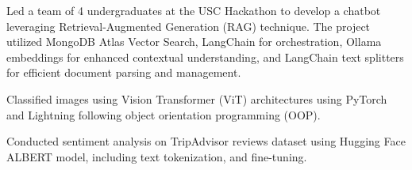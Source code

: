 \begin{cventries}
{\begin{cvitemsfree}
            \item {Led a team of 4 undergraduates at the USC Hackathon to develop a chatbot leveraging Retrieval-Augmented Generation (RAG) technique. The project utilized MongoDB Atlas Vector Search, LangChain for orchestration, Ollama embeddings for enhanced contextual understanding, and LangChain text splitters for efficient document parsing and management.}
            \item{Classified images using Vision Transformer (ViT) architectures using PyTorch and Lightning following object orientation programming (OOP).}
            \item{Conducted sentiment analysis on TripAdvisor reviews dataset using Hugging Face ALBERT model, including text tokenization, and fine-tuning.}
        \end{cvitemsfree}
    }
\end{cventries}